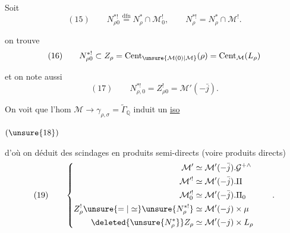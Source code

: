 
Soit
\[
(15)\qquad
N_{\rho0}^{*!}\overset{\mathrm{dfn}}=N_\rho^*\cap\mathcal M_0^!,
\qquad N_\rho^{*!}=N_\rho^*\cap\mathcal M^!.
\]

on trouve
\[
(16)\qquad
N_{\rho0}^{*!}\subset Z_\rho
=\operatorname{Cent}_{\unsure{\mathcal M(0)|\mathcal M}}(\rho)
=\operatorname{Cent}_{\mathcal M}(L_\rho)
\]

et on note aussi
\[
(17)\qquad N_{\rho,0}^{*!}=Z_{\rho0}^{!}=\mathcal M'(-\bar j).
\]

On voit que l'hom $\mathcal M\to\gamma_{\rho,\sigma}
=\widetilde{\Gamma}_{\mathbb Q}$  induit un \uline{iso}

\( (\unsure{18}) \)\quad
{}

d'où on déduit des scindages en produits semi-directs
(voire produits directs)
\[
(19)\qquad
\left\{\begin{aligned}
\mathcal M'&\simeq\mathcal M'(-\bar j).\mathcal G^{+\wedge}\\
\mathcal M^{\prime!}&\simeq\mathcal M'(-\bar j).\Pi\\
\mathcal M_0^{\prime!}&\simeq\mathcal M'(-\bar j).\Pi_0\\
Z_\rho^!\unsure{=|\simeq}\unsure{N_\rho^{*!}}
  &\simeq\mathcal M'(-j)\times\mu\\
\deleted{\unsure{N_\rho^*}}Z_\rho
  &\simeq\mathcal M'(-j)\times L_\rho
\end{aligned}\right.\qquad .
\]


\quad
{}
